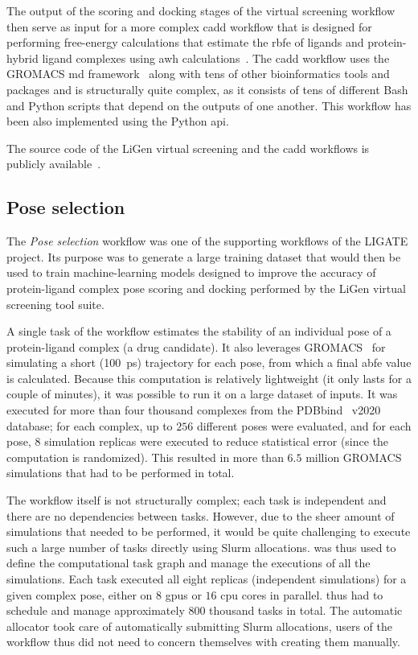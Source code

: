 The output of the scoring and docking stages of the virtual screening workflow then serve as input
for a more complex \gls{cadd} workflow that is designed for performing free-energy
calculations that estimate the \gls{rbfe} of ligands and protein-hybrid ligand
complexes using \gls{awh} calculations~\cite{awh}. The
\gls{cadd} workflow uses the GROMACS \gls{md}
framework~\cite{gromacs} along with tens of other bioinformatics tools and packages and is
structurally quite complex, as it consists of tens of different Bash and Python scripts that depend
on the outputs of one another. This workflow has been also implemented using the
\hyperqueue{} Python \gls{api}.

The source code of the LiGen virtual screening and the \gls{cadd} workflows is
publicly available~\cite{cadd-workflow}.

\subsection{Pose selection}
The \emph{Pose selection} workflow was one of the supporting workflows of the LIGATE project. Its
purpose was to generate a large training dataset that would then be used to train machine-learning
models designed to improve the accuracy of protein-ligand complex pose scoring and docking
performed by the LiGen virtual screening tool suite.

A single task of the workflow estimates the stability of an individual pose of a protein-ligand
complex (a drug candidate). It also leverages GROMACS~\cite{gromacs} for simulating a
short (\SI{100}{\pico\second}) trajectory for each pose, from which a final
\gls{abfe} value is calculated. Because this computation is relatively lightweight (it
only lasts for a couple of minutes), it was possible to run it on a large dataset of inputs. It was
executed for more than four thousand complexes from the PDBbind~\cite{pdbbind} v2020
database; for each complex, up to $256$ different poses were evaluated, and for
each pose, $8$ simulation replicas were executed to reduce statistical error
(since the computation is randomized). This resulted in more than $6.5$ million
GROMACS simulations that had to be performed in total.

The workflow itself is not structurally complex; each task is independent and there are no
dependencies between tasks. However, due to the sheer amount of simulations that needed to be
performed, it would be quite challenging to execute such a large number of tasks directly using
Slurm allocations. \hyperqueue{} was thus used to define the computational task graph and
manage the executions of all the simulations. Each task executed all eight replicas (independent
simulations) for a given complex pose, either on $8$ \glspl{gpu} or
$16$ \gls{cpu} cores in parallel. \hyperqueue{} thus had
to schedule and manage approximately $800$ thousand tasks in total. The automatic
allocator took care of automatically submitting Slurm allocations, users of the workflow thus did
not need to concern themselves with creating them manually.

